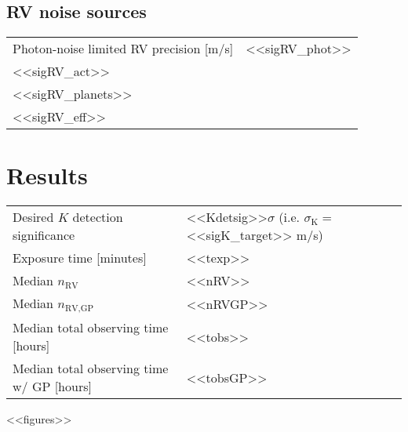 \documentclass[a4paper]{article}
\begin{document}
\subsection{RV noise sources}
\begin{tabular}{ll}
  Photon-noise limited RV precision [m/s] & <<sigRV_phot>> \\
  <<sigRV_act>> \\
  <<sigRV_planets>> \\
  <<sigRV_eff>>
\end{tabular}

\pagebreak

\section{Results}
\begin{tabular}{ll}
  Desired $K$ detection significance & <<Kdetsig>>$\sigma$ (i.e. $\sigma_{\text{K}} =$ <<sigK_target>> m/s) \\
  Exposure time [minutes] & <<texp>> \\
  Median $n_{\text{RV}}$ & <<nRV>> \\
  Median $n_{\text{RV,GP}}$ & <<nRVGP>> \\
  Median total observing time [hours] & <<tobs>> \\
  Median total observing time w/ GP [hours] & <<tobsGP>>
\end{tabular}

<<figures>>
\end{document}
